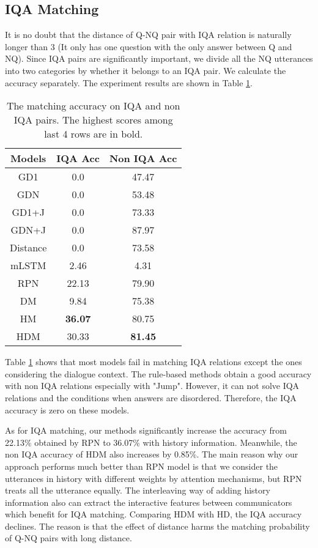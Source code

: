 \subsection{IQA Matching}

It is no doubt that the distance of Q-NQ pair with IQA relation is naturally longer than 3 (It only has one question with the only answer between Q and NQ). Since IQA pairs are significantly important, we divide all the NQ utterances into two categories by whether it belongs to an IQA pair. We calculate the accuracy separately. The experiment results are shown in Table \ref{tab:IQAResults}.

\begin{table}[h]
	\small
	\centering
	\begin{tabular}{ccc}
		\toprule[1.1pt]
		Models &IQA Acc& Non IQA Acc\\
		\midrule[0.75pt]
		GD1&0.0&47.47\\
		GDN  &0.0&53.48\\
		GD1+J&0.0&73.33\\
		GDN+J&0.0&87.97\\
		\hline
		Distance&0.0&73.58\\
		mLSTM&2.46&4.31\\
		RPN&22.13&79.90\\
		\hline
		DM&9.84&75.38\\
		HM&\textbf{36.07}&80.75\\
		HDM&30.33&\textbf{81.45}\\
		\bottomrule[1.1pt]
	\end{tabular}
	\caption{The matching accuracy on IQA and non IQA pairs. The highest scores among last 4 rows are in bold.}
	\label{tab:IQAResults}
\end{table}

Table \ref{tab:IQAResults} shows that most models fail in matching IQA relations except the ones considering the dialogue context. The rule-based methods obtain a good accuracy with non IQA relations especially with "Jump". However, it can not solve IQA relations and the conditions when answers are disordered. Therefore, the IQA accuracy is zero on these models.

As for IQA matching, our methods significantly increase the accuracy from 22.13\% obtained by RPN to 36.07\% with history information. Meanwhile, the non IQA accuracy of HDM also increases by 0.85\%. The main reason why our approach performs much better than RPN model is that we consider the utterances in history with different weights by attention mechanisms, but RPN treats all the utterance equally. The interleaving way of adding history information also can extract the interactive features between communicators which benefit for IQA matching. Comparing HDM with HD, the IQA accuracy declines. The reason is that the effect of distance harms the matching probability of Q-NQ pairs with long distance. 





